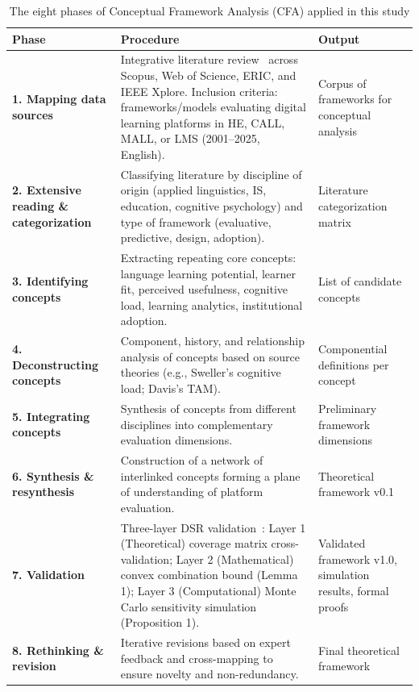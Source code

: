 \documentclass[11pt,a4paper]{article}
\begin{document}
\begin{table}[t]
  \caption{The eight phases of Conceptual Framework Analysis (CFA) applied in this study}
  \label{tab:cfa_phases}
  \centering
  \renewcommand{\arraystretch}{1.3}
  \begin{tabular}{@{} L{3.6cm} L{7.3cm} L{4.1cm} @{} }
    \toprule
    \textbf{Phase} & \textbf{Procedure} & \textbf{Output} \\
    \midrule
    \textbf{1. Mapping data sources} & Integrative literature review~\cite{b8} across Scopus, Web of Science, ERIC, and IEEE Xplore. Inclusion criteria: frameworks/models evaluating digital learning platforms in HE, CALL, MALL, or LMS (2001--2025, English). & Corpus of frameworks for conceptual analysis \\
    \textbf{2. Extensive reading \& categorization} & Classifying literature by discipline of origin (applied linguistics, IS, education, cognitive psychology) and type of framework (evaluative, predictive, design, adoption). & Literature categorization matrix \\
    \textbf{3. Identifying concepts} & Extracting repeating core concepts: language learning potential, learner fit, perceived usefulness, cognitive load, learning analytics, institutional adoption. & List of candidate concepts \\
    \textbf{4. Deconstructing concepts} & Component, history, and relationship analysis of concepts based on source theories (e.g., Sweller's cognitive load; Davis's TAM). & Componential definitions per concept \\
    \textbf{5. Integrating concepts} & Synthesis of concepts from different disciplines into complementary evaluation dimensions. & Preliminary framework dimensions \\
    \textbf{6. Synthesis \& resynthesis} & Construction of a network of interlinked concepts forming a plane of understanding of platform evaluation. & Theoretical framework v0.1 \\
    \textbf{7. Validation} & Three-layer DSR validation~\cite{b34}: Layer 1 (Theoretical) coverage matrix cross-validation; Layer 2 (Mathematical) convex combination bound (Lemma 1); Layer 3 (Computational) Monte Carlo sensitivity simulation (Proposition 1). & Validated framework v1.0, simulation results, formal proofs \\
    \textbf{8. Rethinking \& revision} & Iterative revisions based on expert feedback and cross-mapping to ensure novelty and non-redundancy. & Final theoretical framework \\
    \bottomrule
  \end{tabular}
\end{table}
\end{document}
